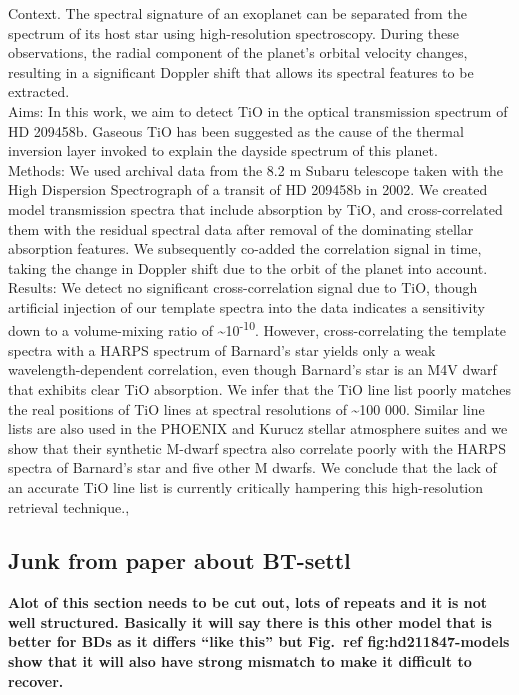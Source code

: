 \citet{hoeijmakers_search_2015}
{Context. The spectral signature of an exoplanet can be separated from the spectrum of its host star using high-resolution spectroscopy. During these observations, the radial component of the planet's orbital velocity changes, resulting in a significant Doppler shift that allows its spectral features to be extracted. \\
     Aims: In this work, we aim to detect TiO in the optical transmission spectrum of HD 209458b. Gaseous TiO has been suggested as the cause of the thermal inversion layer invoked to explain the dayside spectrum of this planet. \\
     Methods: We used archival data from the 8.2 m Subaru telescope taken with the High Dispersion Spectrograph of a transit of HD 209458b in 2002. We created model transmission spectra that include absorption by TiO, and cross-correlated them with the residual spectral data after removal of the dominating stellar absorption features. We subsequently co-added the correlation signal in time, taking the change in Doppler shift due to the orbit of the planet into account. \\
     Results: We detect no significant cross-correlation signal due to TiO, though artificial injection of our template spectra into the data indicates a sensitivity down to a volume-mixing ratio of \textasciitilde{}10\textsuperscript{-10}. However, cross-correlating the template spectra with a HARPS spectrum of Barnard's star yields only a weak wavelength-dependent correlation, even though Barnard's star is an M4V dwarf that exhibits clear TiO absorption. We infer that the TiO line list poorly matches the real positions of TiO lines at spectral resolutions of \textasciitilde{}100 000. Similar line lists are also used in the PHOENIX and Kurucz stellar atmosphere suites and we show that their synthetic M-dwarf spectra also correlate poorly with the HARPS spectra of Barnard's star and five other M dwarfs. We conclude that the lack of an accurate TiO line list is currently critically hampering this high-resolution retrieval technique.},




\subsection{Junk from paper about BT-settl}


\textbf{Alot of this section needs to be cut out, lots of repeats and it is not well structured. Basically it will say there is this other model that is better for BDs as it differs ``like this'' but Fig.~\textbf{ref {fig:hd211847-models}} show that it will also have strong mismatch to make it difficult to recover.}

